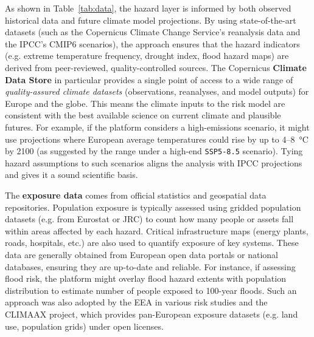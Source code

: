 \documentclass[10pt, conference]{IEEEtran}
\begin{document}
As shown in Table~\ref{tab:data}, the hazard layer is informed by both observed historical data and future climate model projections. By using state-of-the-art datasets (such as the Copernicus Climate Change Service’s reanalysis data and the IPCC’s CMIP6 scenarios), the approach ensures that the hazard indicators (e.g. extreme temperature frequency, drought index, flood hazard maps) are derived from peer-reviewed, quality-controlled sources. The Copernicus \textbf{Climate Data Store} in particular provides a single point of access to a wide range of \textit{quality-assured climate datasets} (observations, reanalyses, and model outputs) for Europe and the globe. This means the climate inputs to the risk model are consistent with the best available science on current climate and plausible futures. For example, if the platform considers a high-emissions scenario, it might use projections where European average temperatures could rise by up to 4–8~°C by 2100 (as suggested by the range under a high-end \texttt{SSP5-8.5} scenario). Tying hazard assumptions to such scenarios aligns the analysis with IPCC projections and gives it a sound scientific basis.

The \textbf{exposure data} comes from official statistics and geospatial data repositories. Population exposure is typically assessed using gridded population datasets (e.g. from Eurostat or JRC) to count how many people or assets fall within areas affected by each hazard. Critical infrastructure maps (energy plants, roads, hospitals, etc.) are also used to quantify exposure of key systems. These data are generally obtained from European open data portals or national databases, ensuring they are up-to-date and reliable. For instance, if assessing flood risk, the platform might overlay flood hazard extents with population distribution to estimate number of people exposed to 100-year floods. Such an approach was also adopted by the EEA in various risk studies and the CLIMAAX project, which provides pan-European exposure datasets (e.g. land use, population grids) under open licenses.
\end{document}
